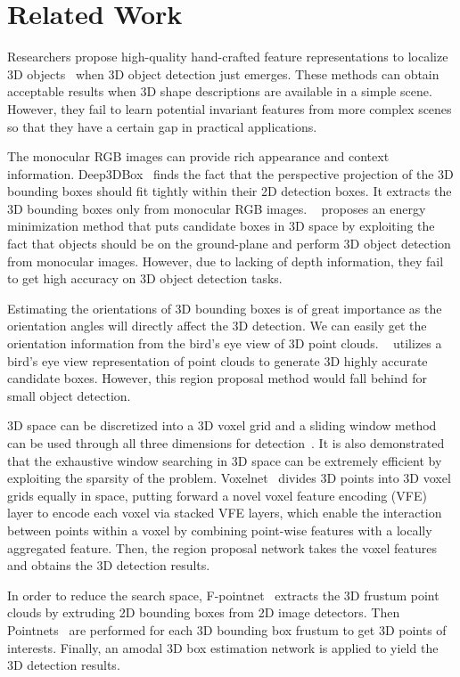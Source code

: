 \documentclass[letterpaper]{article}
\begin{document}
\section{Related Work}
Researchers propose high-quality hand-crafted feature representations to localize 3D objects~\cite{dorai1997cosmos,johnson1999using,rusu2009fast} when 3D object detection just emerges. These methods can obtain acceptable results when 3D shape descriptions are available in a simple scene. However, they fail to learn potential invariant features from  more complex scenes so that they have a certain gap in practical applications.

The monocular RGB images can provide rich appearance and context information. Deep3DBox~\cite{mousavian20173d} finds the fact that the perspective projection of the 3D bounding boxes should fit tightly within their 2D detection boxes. It extracts the 3D bounding boxes only from monocular RGB images. ~\cite{chen2016monocular} proposes an energy minimization method that puts candidate boxes in 3D space by exploiting the fact that objects should be on the ground-plane and perform 3D object detection from monocular images. However, due to lacking of depth information, they fail to get high accuracy on 3D object detection tasks.

Estimating the orientations of 3D bounding boxes is of great importance as the orientation angles will directly affect the 3D detection. We can easily get the orientation information from the bird's eye view of 3D point clouds. ~\cite{chen2017multi} utilizes a bird's eye view representation of point clouds to generate 3D highly accurate candidate boxes. However, this region proposal method would fall behind for small object detection.

3D space can be discretized into a 3D voxel grid and a sliding window method can be used through all three dimensions for detection~\cite{wang2015voting}. It is also demonstrated that the exhaustive window searching in 3D space can be extremely efficient by exploiting the sparsity of the problem. Voxelnet~\cite{zhou2017voxelnet} divides 3D points into 3D voxel grids equally in space, putting forward a novel voxel feature encoding (VFE) layer to encode each voxel via stacked VFE layers, which enable the interaction between points within a voxel by combining point-wise features with a locally aggregated feature. Then, the region proposal network takes the voxel features and obtains the 3D detection results.

In order to reduce the search space, F-pointnet~\cite{qi2017frustum} extracts the 3D frustum point clouds by extruding 2D bounding boxes from 2D image detectors. Then Pointnets~\cite{qi2017pointnet,qi2017pointnet++} are performed for each 3D bounding box frustum to get 3D points of interests. Finally, an amodal 3D box estimation network is applied to yield the 3D detection results.
\end{document}
